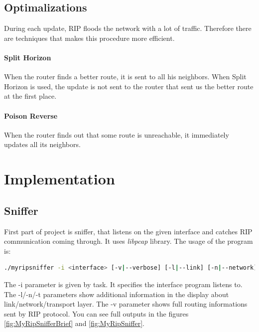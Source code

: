 \documentclass[10pt,a4paper,titlepage]{article}
\begin{document}
        \subsection{Optimalizations}
            During each update, RIP floods the network with a lot of traffic. Therefore there are techniques that makes this procedure
            more efficient.
            \paragraph{Split Horizon}
                When the router finds a better route, it is sent to all his neighbors. When Split Horizon is used, the update is
                not sent to the router that sent us the better route at the first place.
            \paragraph{Poison Reverse} 
                When the router finds out that some route is unreachable, it immediately updates all its neighbors. \cite{RIPJuniper}
                \cite{RIPGuide} \cite{RIPWikipedia} \cite{computernetworking} \cite{mistrovstvivsitich}
    
    \newpage
    \section{Implementation}

        \subsection{Sniffer}
            First part of project is sniffer, that listens on the given interface and catches RIP communication coming through.
            It uses {\it libpcap} library. The usage of the program is:
            \begin{lstlisting}[language=sh, basicstyle=\tiny]
./myripsniffer -i <interface> [-v|--verbose] [-l|--link] [-n|--network] [-t|--transport]
            \end{lstlisting}

            The -i parameter is given by task. It specifies the interface program listens to. The -l/-n/-t parameters show
            additional information in the display about link/network/transport layer. The -v parameter shows full routing
            informations sent by RIP protocol. You can see full outputs in the figures \ref{fig:MyRipSnifferBrief} and \ref{fig:MyRipSniffer}.
\end{document}
